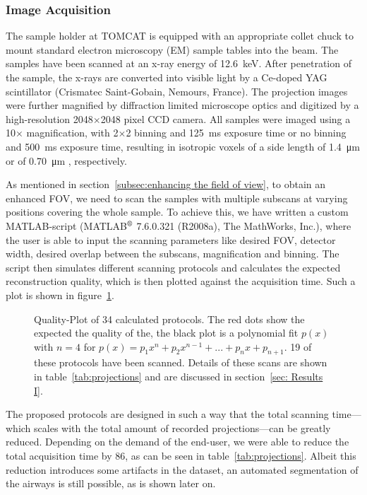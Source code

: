 \subsubsection{Image Acquisition}
\label{seq:Image Acquisition}
The sample holder at TOMCAT is equipped with an appropriate collet chuck to mount standard electron microscopy (EM) sample tables into the beam. The samples have been scanned at an x-ray energy of \SI{12.6}{\kilo\electronvolt}. After penetration of the sample, the x-rays are converted into visible light by a Ce-doped YAG scintillator (Crismatec Saint-Gobain, Nemours, France). The projection images were further magnified by diffraction limited microscope optics and digitized by a high-resolution 2048$\times$2048 pixel CCD camera. All samples were imaged using a 10$\times$ magnification, with 2$\times$2 binning and \SI{125}{\milli\second} exposure time or no binning and \SI{500}{\milli\second} exposure time, resulting in isotropic voxels of a side length of \SI{1.4}{\micro\meter} or of \SI{0.70}{\micro\meter} , respectively.

As mentioned in section~\ref{subsec:enhancing the field of view}, to obtain an enhanced FOV, we need to scan the samples with multiple subscans at varying positions covering the whole sample. To achieve this, we have written a custom MATLAB-script (MATLAB$^\text{\textregistered}$ 7.6.0.321 (R2008a), The MathWorks, Inc.), where the user is able to input the scanning parameters like desired FOV, detector width, desired overlap between the subscans, magnification and binning. The script then simulates different scanning protocols and calculates the expected reconstruction quality, which is then plotted against the acquisition time. Such a plot is shown in figure~\ref{fig:2008c-qualityplot}.

\begin{figure}
	\centering
		
	\caption{Quality-Plot of 34 calculated protocols. The red dots show the expected the quality of the, the black plot is a polynomial fit $p(x)$ with $n=4$ for $p(x)=p_{1}x^{n}+p_{2}x^{n-1}+...+p_{n}x+p_{n+1}$. 19 of these protocols have been scanned. Details of these scans are shown in table~\ref{tab:projections} and are discussed in section~\ref{sec: Results I}.}
	\label{fig:2008c-qualityplot}
\end{figure}

The proposed protocols are designed in such a way that the total scanning time---which scales with the total amount of recorded projections---can be greatly reduced. Depending on the demand of the end-user, we were able to reduce the total acquisition time by 86\percent, as can be seen in table~\ref{tab:projections}. Albeit this reduction introduces some artifacts in the dataset, an automated segmentation of the airways is still possible, as is shown later on. 

